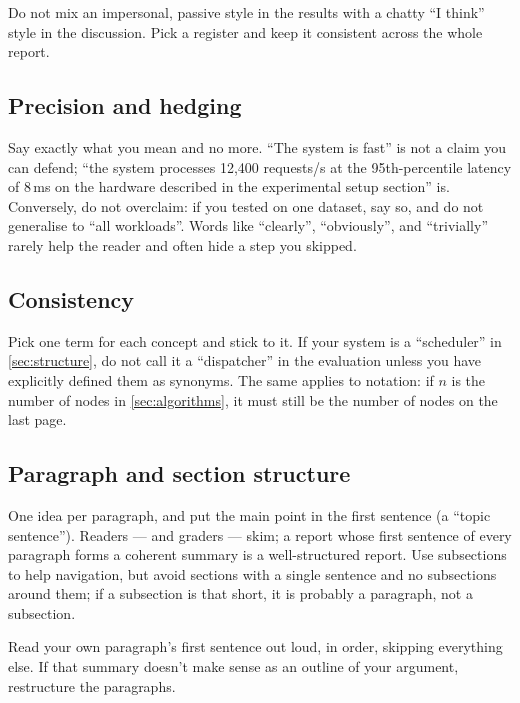\begin{pitfallbox}
      Do not mix an impersonal, passive style in the results with a chatty
      ``I think'' style in the discussion. Pick a register and keep it
      consistent across the whole report.
\end{pitfallbox}

\subsection{Precision and hedging}
Say exactly what you mean and no more. ``The system is fast'' is not a
claim you can defend; ``the system processes 12{,}400 requests/s at the
95th-percentile latency of 8\,ms on the hardware described in the
experimental setup section'' is. Conversely, do not overclaim: if you tested on
one dataset, say so, and do not generalise to ``all workloads''. Words
like ``clearly'', ``obviously'', and ``trivially'' rarely help the
reader and often hide a step you skipped.

\subsection{Consistency}
Pick one term for each concept and stick to it. If your system is a
``scheduler'' in \cref{sec:structure}, do not call it a ``dispatcher'' in
the evaluation unless you have explicitly defined them as synonyms.
The same applies to notation: if $n$ is the number of nodes in
\cref{sec:algorithms}, it must still be the number of nodes on the last
page.

\subsection{Paragraph and section structure}
One idea per paragraph, and put the main point in the first sentence
(a ``topic sentence''). Readers --- and graders --- skim; a report whose
first sentence of every paragraph forms a coherent summary is a
well-structured report. Use subsections to help navigation, but avoid
sections with a single sentence and no subsections around them; if a
subsection is that short, it is probably a paragraph, not a subsection.

\begin{tipbox}
      Read your own paragraph's first sentence out loud, in order, skipping
      everything else. If that summary doesn't make sense as an outline of
      your argument, restructure the paragraphs.
\end{tipbox}
